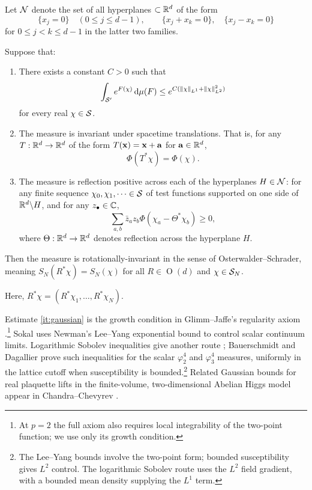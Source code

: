 Let $\mathcal{N}$ denote the set of all hyperplanes $\subset \mathbb{R}^d$ of the form 
\begin{equation}
    \{x_j=0\}\quad(0\leq j\leq d-1),\qquad \{x_j+x_k=0\},\quad \{x_j-x_k=0\}
\end{equation}
for $0\leq j<k\leq d-1$ in the latter two families. 
\begin{theorem} 
\label{thm:main}
Suppose that:
\begin{enumerate}[label=(\roman*)]
\item \label{it:gaussian} There exists a constant $C>0$ such that 
\begin{equation}\label{eq:gaussian}
    \int_{\mathcal{S}'} e^{F(\chi)} \,\mathrm{d} \mu(F) \leq e^{C(\lVert\chi\rVert_{L^1}+\lVert\chi\rVert_{L^2}^2)}
\end{equation}
for every real $\chi\in\mathcal{S}$. 
\item  \label{it:cov}
The measure is invariant under spacetime translations. That is, for any $T:\mathbb{R}^d\to \mathbb{R}^d$ of the form $T(\mathbf{x})=\mathbf{x}+\mathbf{a}$ for $\mathbf{a}\in \mathbb{R}^d$, 
\begin{equation}
    \Phi(T^* \chi) = \Phi(\chi). 
\end{equation}
\item The measure is reflection positive across each of the hyperplanes $H\in \mathcal{N}$: for any finite sequence $\chi_0,\chi_1,\dots \in \mathcal{S}$ of test functions supported on one side of $\mathbb{R}^d\backslash H$, and for any $z_\bullet\in \mathbb{C}$, 
\begin{equation}
    \sum_{a,b} \bar{z}_a z_b \Phi(\chi_a - \Theta^* \chi_b ) \geq 0,
\end{equation}
where $\Theta:\mathbb{R}^d\to\mathbb{R}^d$ denotes reflection across the hyperplane $H$. 
\label{it:RP}
\end{enumerate}
Then the measure is rotationally-invariant in the sense of Osterwalder--Schrader, meaning $S_N(R^* \chi) = S_N(\chi)$ for all $R\in \operatorname{O}(d)$ and $\chi\in \mathcal{S}_N$. 
\end{theorem}
Here, $R^* \chi=(R^* \chi_1,\dots,R^* \chi_N)$. 


Estimate \ref{it:gaussian} is the growth condition in Glimm--Jaffe's
regularity axiom \cite[\S6.1, OS1, (6.1.5)]{GlimmJaffe1987}.\footnote{At
$p=2$ the full axiom also requires local integrability of the two-point
function; we use only its growth condition.}
Sokal \cite[(2.27), \S2.3]{Sokal} uses Newman's Lee--Yang exponential
bound \cite[Theorems~9--10, (3.5) and (4.6)]{Newman1975} to control
scalar continuum limits. Logarithmic Sobolev inequalities give another
route \cite[Proposition~2.3]{Ledoux1999}; Bauerschmidt and Dagallier
\cite[Theorem~1.1(i)]{BauerschmidtDagallier2024} prove such inequalities
for the scalar $\varphi^4_2$ and $\varphi^4_3$ measures, uniformly in
the lattice cutoff when susceptibility is bounded.\footnote{The
Lee--Yang bounds involve the two-point form; bounded susceptibility
gives $L^2$ control. The logarithmic Sobolev route uses the $L^2$ field
gradient, with a bounded mean density supplying the $L^1$ term.}
Related Gaussian bounds for real plaquette lifts in the finite-volume,
two-dimensional Abelian Higgs model appear in Chandra--Chevyrev
\cite[Theorem~4.6 and Corollary~4.8]{ChandraChevyrev2024}.



